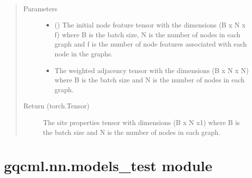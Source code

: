 \documentclass[letterpaper,10pt,english]{sphinxmanual}
\begin{document}
\begin{fulllineitems}

\begin{fulllineitems}
\label{\detokenize{modules/gqcml.nn:gqcml.nn.models.GraphConv_model.site_properties}}~\begin{quote}\begin{description}
\item[{Parameters}] \leavevmode\begin{itemize}
\item {} 
\sphinxstyleliteralstrong{\sphinxupquote{(}}\sphinxstyleliteralstrong{\sphinxupquote{)}} () \textendash{} The initial node feature tensor with the dimensions (B x N x f) where B is the batch
size, N is the number of nodes in each graph and f is the number of node features
associated with each node in the graphs.

\item {} 
\sphinxstyleliteralstrong{\sphinxupquote{(}}\sphinxstyleliteralstrong{\sphinxupquote{)}} \textendash{} The weighted adjacency tensor with the dimensions (B x N x N) where B is the batch
size and N is the number of nodes in each graph.

\end{itemize}

\item[{Return (torch.Tensor)}] \leavevmode
The site properties tensor with dimensions (B x N x1) where B is the batch
size and N is the number of nodes in each graph.

\end{description}\end{quote}

\end{fulllineitems}


\end{fulllineitems}



\section{gqcml.nn.models\_test module}
\label{\detokenize{modules/gqcml.nn:module-gqcml.nn.models_test}}\label{\detokenize{modules/gqcml.nn:gqcml-nn-models-test-module}}
\end{document}
